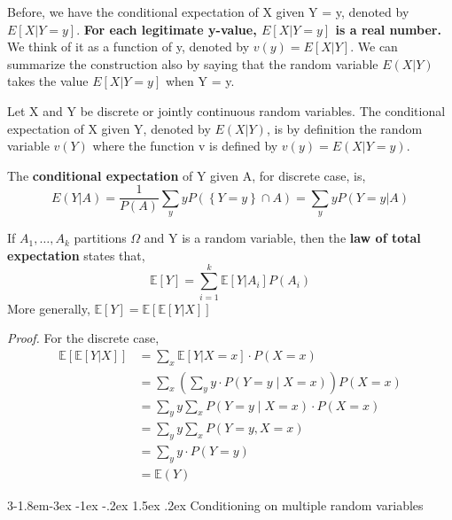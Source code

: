 \documentclass{tufte-handout}
\makeatletter
\renewcommand{\subsection}{\@startsection{subsection}%
    {3}{-1.8em}{-3ex \@plus -1ex \@minus -.2ex}%
    {1.5ex \@plus .2ex}
    {\hspace*{-5.5em}\fcolorbox{ltblue}{ltblue}{\parbox[c][1.0ex][b]{4em}{\phantom{space}}}
    \normalfont\large\itshape\color{ltblue}}}
\makeatother
\begin{document}
    Before, we have the conditional expectation of X given Y = y, denoted by $ E[X|Y=y] $. \textbf{For each legitimate
    y-value, $ E[X|Y=y] $ is a real number. }We think of it as a function of y, denoted by $ v(y)=E[X|Y] $.
    We can summarize the construction also by saying that the random variable $ E(X|Y) $ takes the value $ E[X|Y=y] $ when Y = y.

    

    \begin{Definition}
        Let X and Y be discrete or jointly continuous random variables. 
        The conditional expectation of X given Y, denoted by $ E(X|Y) $, is by definition the 
        random variable $ v(Y) $ where the function v is defined by $ v(y)=E(X|Y=y ) $.
    \end{Definition}

    \begin{Definition}
        The \textbf{conditional expectation} of Y  given A, for discrete case, is,
        \[E(Y|A ) = \frac{1}{P(A)}\sum_{y }yP(\left\{ Y=y \right\}\cap A)=\sum_{y }yP(Y=y|A)\]
    \end{Definition}

    \begin{Definition}
        If $ A_{1},\dots,A_{k } $ partitions $ \Omega $ and Y is a random variable, 
        then the \textbf{law of total expectation } states that,
        \[\mathbb{E }\left[ Y\right]= \sum_{i=1}^{k }\mathbb{E }[Y|A_{i }]P(A_{i})
        \]
        More generally, $\mathbb{E }\left[ Y\right]= \mathbb{E}[\mathbb{E }[Y|X]]  $
    \end{Definition}
    \textit{Proof.} For the discrete case,
    \begin{align*}
        \mathbb{E}[\mathbb{E }[Y|X]] &= \sum_{x}\mathbb{E }[Y|X=x ] \cdot P(X=x ) \\
        &= \sum_{x} \left( \sum_y y \cdot P(Y = y \mid X = x) \right)P(X=x )\\
        &= \sum_y y \sum_x P(Y = y \mid X = x)\cdot P(X=x )\\
        &=\sum_y y \sum_x P(Y = y , X = x)\\
        &= \sum_y y \cdot P(Y=y)\\
        &= \mathbb{E }(Y)
    \end{align*}


    \subsection{Conditioning on multiple random variables}
    
\end{document}
